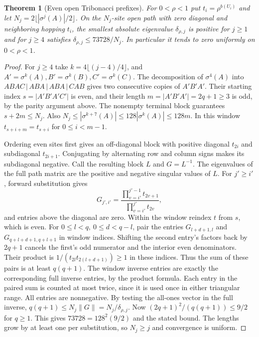 \documentclass[11pt,reqno]{amsart}
\newtheorem{theorem}{Theorem}[section]
\theoremstyle{definition}
\theoremstyle{remark}
\numberwithin{equation}{section}
\begin{document}
\begin{theorem}[Even open Tribonacci prefixes]\label{m9:chain}
For \(0<\rho<1\) put \(t_i=\rho^{b(U_i)}\) and let
\(N_j=2\lfloor|\sigma^j(A)|/2\rfloor\).
On the \(N_j\)-site open path with zero diagonal and
neighboring hopping \(t_i\), the smallest absolute
eigenvalue \(\delta_{\rho,j}\) is positive for \(j\ge1\)
and for \(j\ge4\) satisfies
\(\delta_{\rho,j}\le73728/N_j\). In particular it tends to
zero uniformly on \(0<\rho<1\).
\end{theorem}
\begin{proof}
For \(j\ge4\) take \(k=4\lfloor(j-4)/4\rfloor\), and
\(A'=\sigma^k(A), B'=\sigma^k(B), C'=\sigma^k(C)\).
The decomposition of \(\sigma^4(A)\) into
\(ABAC\,|\,ABA\,|\,ABA\,|\,CAB\) gives two consecutive
copies of \(A'B'A'\). Their starting index \(s=|A'B'A'C'|\)
is even, and their length \(m=|A'B'A'|=2q+1\ge3\)
is odd, by the parity argument above. The nonempty terminal
block guarantees \(s+2m\le N_j\). Also
\(N_j\le|\sigma^{k+7}(A)|\le128 |\sigma^k(A)|\le128m\).
In this window \(t_{s+i+m}=t_{s+i}\) for \(0\le i<m-1\).

Ordering even sites first gives an off-diagonal block with
positive diagonal \(t_{2i}\) and subdiagonal \(t_{2i+1}\).
Conjugating by alternating row and column signs makes its
subdiagonal negative. Call the resulting block \(L\) and
\(G=L^{-1}\). The eigenvalues of the full path matrix are
the positive and negative singular values of \(L\).
For \(j'\ge i'\), forward substitution gives
\[
 G_{j',i'}=\frac{\prod_{v=i'}^{j'-1}t_{2v+1}}
                 {\prod_{v=i'}^{j'}t_{2v}},
\]
and entries above the diagonal are zero.
Within the window reindex \(t\) from \(s\), which is even.
For \(0\le l<q,\ 0\le d<q-l\), pair the entries
\(G_{l+d+1,l}\) and \(G_{q+l+d+1,q+l+1}\) in window
indices. Shifting the second entry's factors back by
\(2q+1\) cancels the first's odd numerator and the
interior even denominators. Their product is
\(1/(t_{2l}t_{2(l+d+1)})\ge1\) in these indices.
Thus the sum of these pairs is at least \(q(q+1)\).
The window inverse entries are exactly the corresponding
full inverse entries, by the product formula. Each entry in
the paired sum is counted at most twice, since it is used
once in either triangular range. All entries are nonnegative.
By testing the all-ones vector in the full inverse,
\(q(q+1)\le N_j\|G\|=N_j/\delta_{\rho,j}\).
Now \((2q+1)^2/(q(q+1))\le9/2\) for \(q\ge1\).
This gives \(73728=128^2(9/2)\) and the stated bound.
The lengths grow by at least one per substitution, so
\(N_j\ge j\) and convergence is uniform.
\end{proof}
\end{document}

